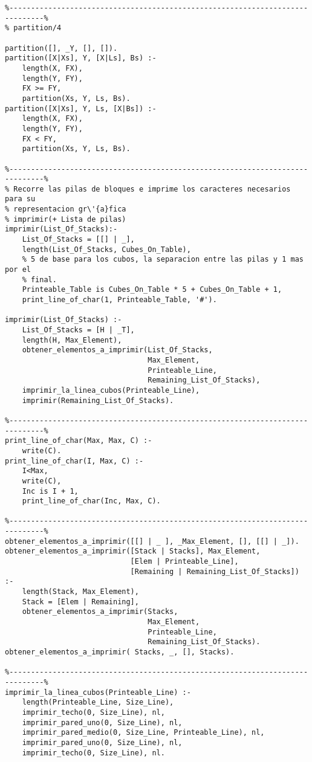 \documentclass[a4paper,12pt]{report}
\begin{document}
\begin{footnotesize}
\begin{verbatim}
%------------------------------------------------------------------------------%
% partition/4

partition([], _Y, [], []).
partition([X|Xs], Y, [X|Ls], Bs) :-
    length(X, FX),
    length(Y, FY),
    FX >= FY,
    partition(Xs, Y, Ls, Bs).
partition([X|Xs], Y, Ls, [X|Bs]) :-
    length(X, FX),
    length(Y, FY),
    FX < FY,
    partition(Xs, Y, Ls, Bs).

%------------------------------------------------------------------------------%
% Recorre las pilas de bloques e imprime los caracteres necesarios para su 
% representacion gr\'{a}fica
% imprimir(+ Lista de pilas)    
imprimir(List_Of_Stacks):-
    List_Of_Stacks = [[] | _],
    length(List_Of_Stacks, Cubes_On_Table),
    % 5 de base para los cubos, la separacion entre las pilas y 1 mas por el 
    % final.
    Printeable_Table is Cubes_On_Table * 5 + Cubes_On_Table + 1,
    print_line_of_char(1, Printeable_Table, '#').
    
imprimir(List_Of_Stacks) :-
    List_Of_Stacks = [H | _T],
    length(H, Max_Element),
    obtener_elementos_a_imprimir(List_Of_Stacks, 
                                 Max_Element, 
                                 Printeable_Line, 
                                 Remaining_List_Of_Stacks),
    imprimir_la_linea_cubos(Printeable_Line),
    imprimir(Remaining_List_Of_Stacks).
    
%------------------------------------------------------------------------------%
print_line_of_char(Max, Max, C) :-
    write(C).
print_line_of_char(I, Max, C) :-
    I<Max,
    write(C),
    Inc is I + 1,
    print_line_of_char(Inc, Max, C).
        
%------------------------------------------------------------------------------%
obtener_elementos_a_imprimir([[] | _ ], _Max_Element, [], [[] | _]).
obtener_elementos_a_imprimir([Stack | Stacks], Max_Element, 
                             [Elem | Printeable_Line], 
                             [Remaining | Remaining_List_Of_Stacks]) :-
    length(Stack, Max_Element),
    Stack = [Elem | Remaining],
    obtener_elementos_a_imprimir(Stacks, 
                                 Max_Element, 
                                 Printeable_Line, 
                                 Remaining_List_Of_Stacks).
obtener_elementos_a_imprimir( Stacks, _, [], Stacks).

%------------------------------------------------------------------------------%
imprimir_la_linea_cubos(Printeable_Line) :-
    length(Printeable_Line, Size_Line),
    imprimir_techo(0, Size_Line), nl,
    imprimir_pared_uno(0, Size_Line), nl, 
    imprimir_pared_medio(0, Size_Line, Printeable_Line), nl,
    imprimir_pared_uno(0, Size_Line), nl,
    imprimir_techo(0, Size_Line), nl.


\end{verbatim}
\end{footnotesize}
\end{document}
